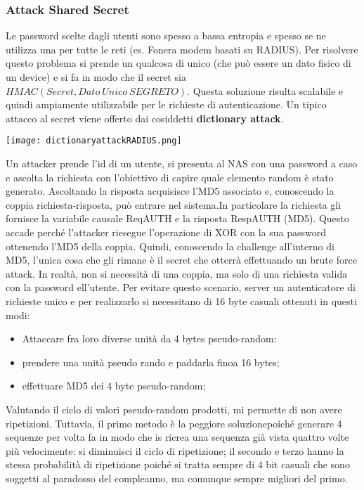 \documentclass{article}
\theoremstyle{remark}
\begin{document}
\subsubsection{Attack Shared Secret}
Le password scelte dagli utenti sono spesso a bassa entropia e spesso se ne utilizza una per tutte le reti (es. Fonera modem basati su RADIUS).
Per risolvere questo problema si prende un qualcosa di unico (che può essere un dato fisico di un device) e si fa in modo che il secret sia $HMAC(Secret,Dato\ Unico\ SEGRETO)$. Questa soluzione risulta scalabile e quindi ampiamente utilizzabile per le richieste di autenticazione.
Un tipico attacco al secret viene offerto dai cosiddetti \textbf{dictionary attack}.\begin{center}
    \texttt{[image: dictionaryattackRADIUS.png]}
\end{center}
Un attacker prende l'id di un utente, si presenta al NAS con una password a caso e ascolta la richiesta con l'obiettivo di capire quale elemento random è stato generato. Ascoltando la risposta acquisisce l'MD5 associato e, conoscendo la coppia richiesta-risposta, può entrare nel sistema.In particolare la richiesta gli fornisce la variabile causale ReqAUTH e la risposta RespAUTH (MD5). Questo accade perché l'attacker riesegue l'operazione di XOR con la sua password ottenendo l'MD5 della coppia. Quindi, conoscendo la challenge all'interno di MD5, l'unica cosa che gli rimane è il secret che otterrà effettuando un brute force attack. In realtà, non si necessità di una coppia, ma solo di una richiesta valida con la password ell'utente.\newline
Per evitare questo scenario, server un autenticatore di richieste unico e per realizzarlo si necessitano di 16 byte casuali ottenuti in questi modi:\begin{itemize}
    \item Attaccare fra loro diverse unità da 4  bytes pseudo-random:
    \item prendere una unità pseudo rando e paddarla finoa  16 bytes;
    \item effettuare MD5 dei 4 byte pseudo-random;
\end{itemize}
Valutando il ciclo di valori pseudo-random prodotti, mi permette di non avere ripetizioni. Tuttavia, il primo metodo è la peggiore soluzionepoiché generare 4 sequenze per volta fa in modo che is ricrea una sequenza già vista quattro volte più velocimente: si diminuisci il ciclo di ripetizione; il secondo e terzo hanno la stessa probabilità di ripetizione poiché si tratta sempre di 4 bit casuali che sono soggetti al paradosso del compleanno, ma comunque sempre migliori del primo.
\end{document}
